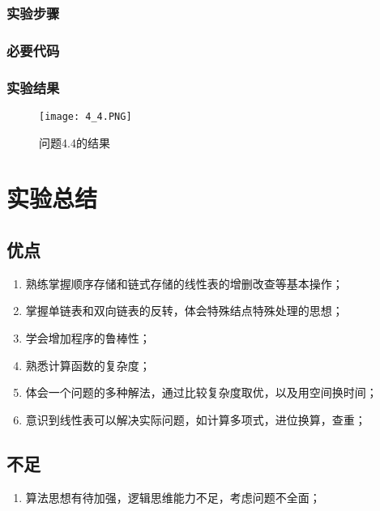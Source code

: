 \subsubsection{实验步骤}
\subsubsection{必要代码}

\subsubsection{实验结果}
	\begin{figure}[!bthp]
	\centering
        \texttt{[image: 4\_4.PNG]}
        \caption{问题4.4的结果}
      \end{figure}
\section{实验总结}
\subsection{优点}
\begin{enumerate}
\item 熟练掌握顺序存储和链式存储的线性表的增删改查等基本操作；
\item 掌握单链表和双向链表的反转，体会特殊结点特殊处理的思想；
\item  学会增加程序的鲁棒性；
\item  熟悉计算函数的复杂度；
\item  体会一个问题的多种解法，通过比较复杂度取优，以及用空间换时间；
\item  意识到线性表可以解决实际问题，如计算多项式，进位换算，查重；
\end{enumerate}
\subsection{不足}
\begin{enumerate}
\item 算法思想有待加强，逻辑思维能力不足，考虑问题不全面；
\end{enumerate}

